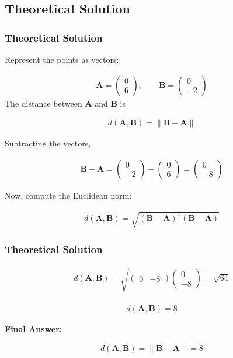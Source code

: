 \documentclass{beamer}
\theoremstyle{remark}
\newcommand{\myvec}[1]{\ensuremath{\begin{pmatrix}#1\end{pmatrix}}}
\let\vec\mathbf
\numberwithin{equation}{section}
\begin{document}
\subsection{Theoretical Solution }
\begin{frame}
\frametitle{Theoretical Solution}
Represent the points as vectors:

\begin{align}
 \vec{A}= \myvec{0 \\ 6}, \qquad \vec{B} = \myvec{0 \\ -2} 
\end{align}
The distance between $\vec{A}$ and $\vec{B}$ is


\begin{align}
d(\vec{A},\vec{B}) = \|\vec{B} - \vec{A}\| 
\end{align}

Subtracting the vectors,

\begin{align}
\vec{B} - \vec{A} = \myvec{0 \\ -2} - \myvec{0 \\ 6} = \myvec{0 \\ -8}
\end{align}


Now, compute the Euclidean norm:

\begin{align}
d(\vec{A},\vec{B}) = \sqrt{(\vec{B}-\vec{A})^T(\vec{B}-\vec{A})}
\end{align}
\end{frame}

\begin{frame}
\frametitle{Theoretical Solution}

\begin{align}
d(\vec{A},\vec{B}) = \sqrt{\myvec{0 & -8}\myvec{0 \\ -8}} = \sqrt{64}
\end{align}


\begin{align}
 d(\vec{A},\vec{B}) = 8 
\end{align}



\textbf{Final Answer:}

\begin{align}
 d(\vec{A},\vec{B}) = \|\vec{B} - \vec{A}\| = 8
\end{align}



\end{frame}
\end{document}
